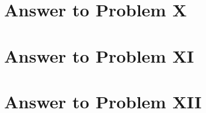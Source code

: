 \documentclass[11pt,a4paper]{article}
\begin{document}
\section{Answer to Problem X}\label{sec:P10}



\clearpage

\section{Answer to Problem XI}\label{sec:P11}



\clearpage

\section{Answer to Problem XII}\label{sec:P12}



\clearpage


\printbibliography

\end{document}
